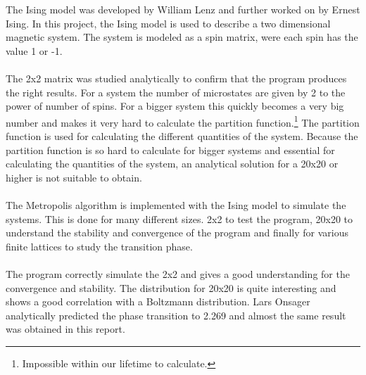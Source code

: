 The Ising model was developed by William Lenz and further worked on by Ernest Ising. In this project, the Ising model is used to describe a two dimensional magnetic system. The system is modeled as a spin matrix, were each spin has the value 1 or -1.
\\
\\
The 2x2 matrix was studied analytically to confirm that the program produces the right results. For a system the number of microstates are given by 2 to the power of number of spins. For a bigger system this quickly becomes a very big number and makes it very hard to calculate the partition function.\footnote{Impossible within our lifetime to calculate.} The partition function is used for calculating the different quantities of the system. Because the partition function is so hard to calculate for bigger systems and essential for calculating the quantities of the system, an analytical solution for a 20x20 or higher is not suitable to obtain.
\\
\\
The Metropolis algorithm is implemented with the Ising model to simulate the systems. This is done for many different sizes. 2x2 to test the program, 20x20 to understand the stability and convergence of the program and finally for various finite lattices to study the transition phase. 
\\
\\
The program correctly simulate the 2x2 and gives a good understanding for the convergence and stability. The distribution for 20x20 is quite interesting and shows a good correlation with a Boltzmann distribution. Lars Onsager analytically predicted the phase transition to 2.269 and almost the same result was obtained in this report.